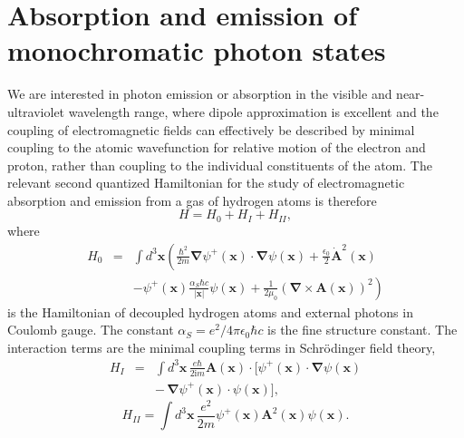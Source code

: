\documentclass[final,3p,12pt]{elsarticle3}
\begin{document}
\section{Absorption and emission of monochromatic photon states}
\label{sec:mono}

We are interested in photon emission or absorption in the visible and near-ultraviolet
wavelength range, where dipole approximation is excellent and the coupling of 
electromagnetic fields can effectively be described by minimal coupling to the atomic 
wavefunction for relative motion of the electron and proton, rather than coupling to the 
individual constituents of the atom.
The relevant second quantized Hamiltonian for the study of electromagnetic
absorption and emission from a gas of hydrogen atoms is therefore
\begin{equation}\label{eq:Hegamma}
H=H_0+H_I+H_{II},
\end{equation}
where 
\begin{eqnarray*}
H_0&=&\int\!d^3\bm{x}\left(
\frac{\hbar^2}{2m}\bm{\nabla}\psi^+(\bm{x})\cdot\!\bm{\nabla}\psi(\bm{x})
+\frac{\epsilon_0}{2}\dot{\bm{A}}^2(\bm{x})
\right.
\\
&&
-\left.\psi^+(\bm{x})\frac{\alpha_S\hbar c}{|\bm{x}|}\psi(\bm{x})
+\frac{1}{2\mu_0}\left(\bm{\nabla}\times\bm{A}(\bm{x})\right)^2\right)
\end{eqnarray*}
is the Hamiltonian of decoupled hydrogen atoms and external photons
in Coulomb gauge. The constant $\alpha_S=e^2/4\pi\epsilon_0\hbar c$ is 
the fine structure constant.
The interaction terms are the minimal coupling terms
in Schr\"odinger field theory,
\begin{eqnarray} \nonumber
H_I&=&\int\!d^3\bm{x}\,
\frac{e\hbar}{2\mathrm{i}m}\bm{A}(\bm{x})\cdot
[\psi^+(\bm{x})\cdot\bm{\nabla}\psi(\bm{x})
\\ \label{eq:H1}
&&
-\,\bm{\nabla}\psi^+(\bm{x})\cdot\psi(\bm{x})],
\end{eqnarray}
\begin{equation}\label{eq:H2}
H_{II}=\int\!d^3\bm{x}\,\frac{e^2}{2m}\psi^+(\bm{x})
\bm{A}^2(\bm{x})\psi(\bm{x}).
\end{equation}
\end{document}
